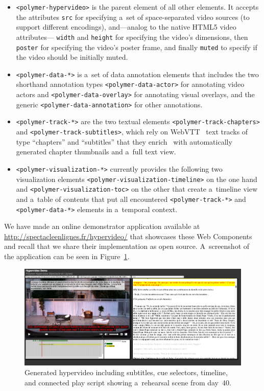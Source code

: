 \documentclass[conference]{IEEEtran}
\begin{document}
\begin{itemize}
  \item \texttt{<polymer-hypervideo>} is the parent element of all other elements.
    It accepts the attributes \texttt{src} for specifying a~set of
    space-separated video sources (to support different encodings),
    and---analog to the native HTML5 video attributes---%
    \texttt{width} and \texttt{height} for specifying the video's dimensions,
    then \texttt{poster} for specifying the video's poster frame, and finally \texttt{muted} to specify if the video should be initially muted.
  \item \texttt{<polymer-data-*>} is a~set of data annotation elements
    that includes the two shorthand annotation types
    \texttt{<polymer-data-actor>} for annotating video actors and
    \texttt{<polymer-data-overlay>} for annotating visual overlays,
    and the generic \texttt{<polymer-data-annotation>} for other annotations.
  \item \texttt{<polymer-track-*>} are the two textual elements
    \texttt{<polymer-track-chapters>} and \texttt{<polymer-track-subtitles>},
    which rely on WebVTT~\cite{pfeiffer2013webvtt} text tracks
    of type ``chapters'' and ``subtitles'' that they enrich~\cite{steiner2014webvtt} with
    automatically generated chapter thumbnails and a~full text view.
  \item \texttt{<polymer-visualization-*>} currently provides the
    following two visualization elements
    \texttt{<polymer-visualization-timeline>} on the one hand and 
    \texttt{<polymer-visualization-toc>} on the other
    that create a~timeline view and a~table of contents
    that put all encountered \texttt{<polymer-track-*>}
    and \texttt{<polymer-data-*>} elements in a~temporal context.
\end{itemize}

\noindent We have made an online demonstrator application available at
\url{http://spectacleenlignes.fr/hypervideo/} that showcases these Web Components
and recall that we share their implementation as open source.
A~screenshot of the application can be seen in Figure~\ref{fig:screenshot}.

\begin{figure}[htb!]
  \centering
  \includegraphics[width=0.95\linewidth]{screenshot}
  \caption{Generated hypervideo including subtitles, cue selectors, timeline, and connected play script
    showing a~rehearsal scene from day~40.}
  \label{fig:screenshot}
\end{figure}
\end{document}
